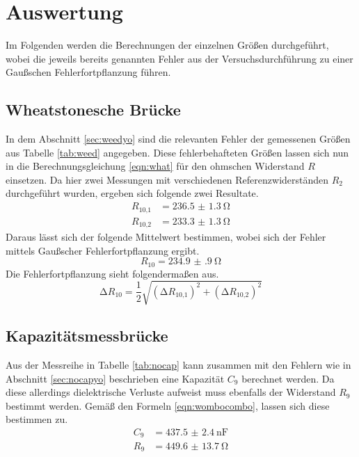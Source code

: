 \section{Auswertung}
Im Folgenden werden die Berechnungen der einzelnen Größen durchgeführt, wobei die jeweils bereits genannten Fehler aus der Versuchsdurchführung zu einer
Gaußschen Fehlerfortpflanzung führen. 

\subsection{Wheatstonesche Brücke}
In dem Abschnitt \ref{sec:weedyo} sind die relevanten Fehler der gemessenen Größen aus Tabelle \ref{tab:weed} angegeben. Diese fehlerbehafteten Größen lassen sich nun in die Berechnungsgleichung \eqref{eqn:what}
für den ohmschen Widerstand $R$ einsetzen.
Da hier zwei Messungen mit verschiedenen Referenzwiderständen $R_{2}$ durchgeführt wurden, ergeben sich folgende zwei Resultate.
\begin{align*}
R_{10\text{,}1} &= \SI{236.5(13)}{\ohm} \\
R_{10\text{,}2} &= \SI{233.3(13)}{\ohm} 
\end{align*}
Daraus lässt sich der folgende Mittelwert bestimmen, wobei sich der Fehler mittels Gaußscher Fehlerfortpflanzung ergibt.
\begin{equation*}
R_{10} = \SI{234.9(9)}{\ohm}
\end{equation*}
Die Fehlerfortpflanzung sieht folgendermaßen aus.
\begin{equation*}
\increment R_{10} = \frac{1}{2} \sqrt{(\increment R_{10\text{,}1})^{2} + (\increment R_{10\text{,}2})^{2} }
\end{equation*}



\subsection{Kapazitätsmessbrücke}
Aus der Messreihe in Tabelle \ref{tab:nocap} kann zusammen mit den Fehlern wie in Abschnitt \ref{sec:nocapyo} beschrieben eine Kapazität $C_{9}$ berechnet werden. Da diese allerdings dielektrische Verluste 
aufweist muss ebenfalls der Widerstand $R_{9}$ bestimmt werden. Gemäß den Formeln \eqref{eqn:wombocombo}, lassen sich diese bestimmen zu.
\begin{align*}
C_{9} &= \SI{437.5(24)}{\nano\farad} \\
R_{9} &= \SI{449.6(137)}{\ohm} 
\end{align*}

